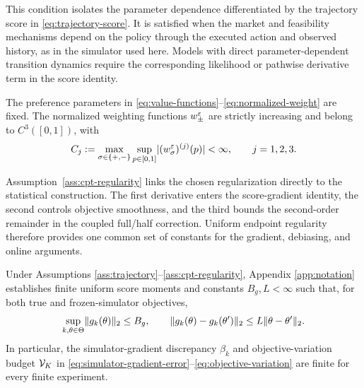 This condition isolates the parameter dependence differentiated by the trajectory score in \eqref{eq:trajectory-score}.  It is satisfied when the market and feasibility mechanisms depend on the policy through the executed action and observed history, as in the simulator used here.  Models with direct parameter-dependent transition dynamics require the corresponding likelihood or pathwise derivative term in the score identity.

\begin{assumption}\label{ass:cpt-regularity}
The preference parameters in \eqref{eq:value-functions}--\eqref{eq:normalized-weight} are fixed.  The normalized weighting functions $w_\pm^\varepsilon$ are strictly increasing and belong to $C^3([0,1])$, with
\begin{equation}\label{eq:weight-derivative-bounds}
 C_j
 :=\max_{\sigma\in\{+,-\}}\sup_{p\in[0,1]}
 \lvert(w_\sigma^\varepsilon)^{(j)}(p)\rvert
 <\infty,
 \qquad j=1,2,3.
\end{equation}
\end{assumption}

Assumption~\ref{ass:cpt-regularity} links the chosen regularization directly to the statistical construction.  The first derivative enters the score-gradient identity, the second controls objective smoothness, and the third bounds the second-order remainder in the coupled full/half correction.  Uniform endpoint regularity therefore provides one common set of constants for the gradient, debiasing, and online arguments.

Under Assumptions \ref{ass:trajectory}--\ref{ass:cpt-regularity}, Appendix \ref{app:notation} establishes finite uniform score moments and constants $B_g,L<\infty$ such that, for both true and frozen-simulator objectives,
\begin{equation}\label{eq:gradient-smoothness-summary}
 \sup_{k,\theta\in\Theta}\lVert g_k(\theta)\rVert_2\le B_g,
 \qquad
 \lVert g_k(\theta)-g_k(\theta')\rVert_2
 \le L\lVert\theta-\theta'\rVert_2.
\end{equation}
In particular, the simulator-gradient discrepancy $\beta_k$ and objective-variation budget $\mathcal V_K$ in \eqref{eq:simulator-gradient-error}--\eqref{eq:objective-variation} are finite for every finite experiment.